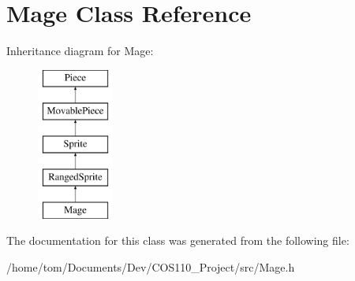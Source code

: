 \hypertarget{classMage}{\section{Mage Class Reference}
\label{classMage}
}
Inheritance diagram for Mage\-:\begin{figure}[H]
\begin{center}
\leavevmode
\includegraphics[height=5.000000cm]{classMage}
\end{center}
\end{figure}


The documentation for this class was generated from the following file\-:\begin{DoxyCompactItemize}
\item 
/home/tom/\-Documents/\-Dev/\-C\-O\-S110\-\_\-\-Project/src/Mage.\-h\end{DoxyCompactItemize}
